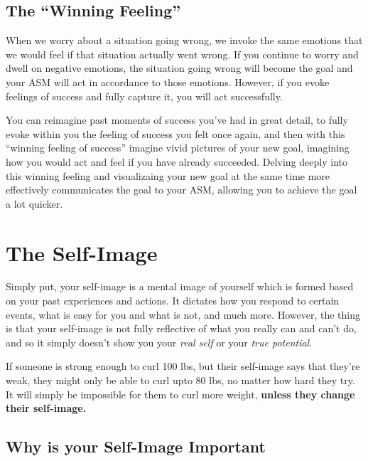 \documentclass[
]{book}
\begin{document}
\hypertarget{the-winning-feeling}{%
\section{The ``Winning Feeling''}\label{the-winning-feeling}}

When we worry about a situation going wrong, we invoke the same emotions that we would feel if that situation actually went wrong. If you continue to worry and dwell on negative emotions, the situation going wrong will become the goal and your ASM will act in accordance to those emotions. However, if you evoke feelings of success and fully capture it, you will act successfully.

You can reimagine past moments of success you've had in great detail, to fully evoke within you the feeling of success you felt once again, and then with this ``winning feeling of success'' imagine vivid pictures of your new goal, imagining how you would act and feel if you have already succeeded. Delving deeply into this winning feeling and visualizaing your new goal at the same time more effectively communicates the goal to your ASM, allowing you to achieve the goal a lot quicker.

\hypertarget{the-self-image}{%
\chapter{The Self-Image}\label{the-self-image}}

Simply put, your self-image is a mental image of yourself which is formed based on your past experiences and actions. It dictates how you respond to certain events, what is easy for you and what is not, and much more. However, the thing is that your self-image is not fully reflective of what you really can and can't do, and so it simply doesn't show you your \emph{real self} or your \emph{true potential}.

If someone is strong enough to curl 100 lbs, but their self-image says that they're weak, they might only be able to curl upto 80 lbs, no matter how hard they try. It will simply be impossible for them to curl more weight, \textbf{unless they change their self-image.}

\hypertarget{why-is-your-self-image-important}{%
\section{Why is your Self-Image Important}\label{why-is-your-self-image-important}}
\end{document}
